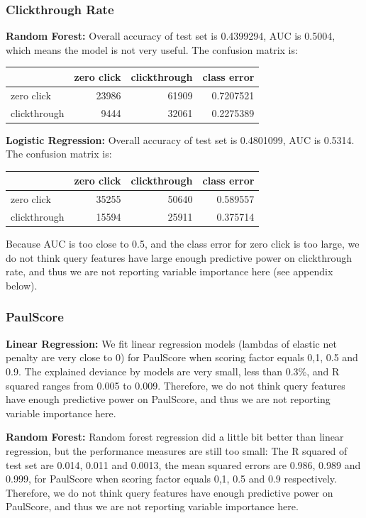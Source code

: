 \documentclass[12pt,]{article}
\begin{document}
\subsubsection{Clickthrough Rate}\label{clickthrough-rate}

\textbf{Random Forest: } Overall accuracy of test set is 0.4399294, AUC
is 0.5004, which means the model is not very useful. The confusion
matrix is:

\begin{longtable}[]{@{}lrrr@{}}
\toprule
& zero click & clickthrough & class error\tabularnewline
\midrule
\endhead
zero click & 23986 & 61909 & 0.7207521\tabularnewline
clickthrough & 9444 & 32061 & 0.2275389\tabularnewline
\bottomrule
\end{longtable}

\textbf{Logistic Regression: } Overall accuracy of test set is
0.4801099, AUC is 0.5314. The confusion matrix is:

\begin{longtable}[]{@{}lrrr@{}}
\toprule
& zero click & clickthrough & class error\tabularnewline
\midrule
\endhead
zero click & 35255 & 50640 & 0.589557\tabularnewline
clickthrough & 15594 & 25911 & 0.375714\tabularnewline
\bottomrule
\end{longtable}

Because AUC is too close to 0.5, and the class error for zero click is
too large, we do not think query features have large enough predictive
power on clickthrough rate, and thus we are not reporting variable
importance here (see appendix below).

\subsubsection{PaulScore}\label{paulscore}

\textbf{Linear Regression: } We fit linear regression models (lambdas of
elastic net penalty are very close to 0) for PaulScore when scoring
factor equals 0,1, 0.5 and 0.9. The explained deviance by models are
very small, less than 0.3\%, and R squared ranges from 0.005 to 0.009.
Therefore, we do not think query features have enough predictive power
on PaulScore, and thus we are not reporting variable importance here.

\textbf{Random Forest: } Random forest regression did a little bit
better than linear regression, but the performance measures are still
too small: The R squared of test set are 0.014, 0.011 and 0.0013, the
mean squared errors are 0.986, 0.989 and 0.999, for PaulScore when
scoring factor equals 0,1, 0.5 and 0.9 respectively. Therefore, we do
not think query features have enough predictive power on PaulScore, and
thus we are not reporting variable importance here.
\end{document}
